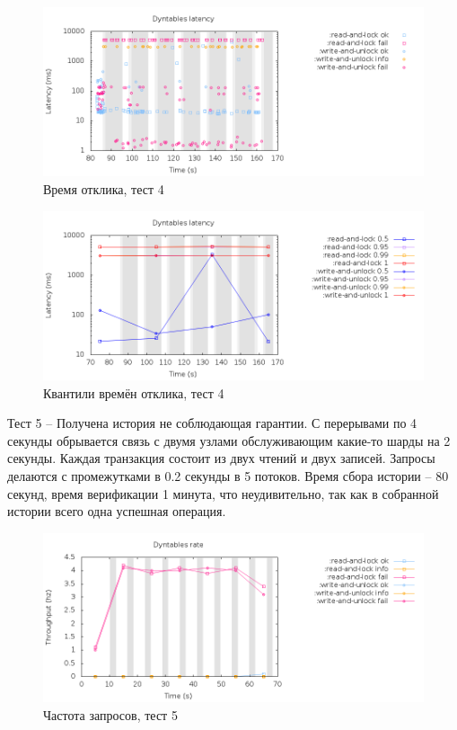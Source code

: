 \documentclass[pdftex,ptm,14pt,a4paper]{extreport}
\theoremstyle{definition}
\begin{document}
\begin{figure}[h]
    \includegraphics[scale=0.6]{dyntables-4/latency-raw.png}
    \caption{Время отклика, тест 4}
\end{figure}

\begin{figure}[h]
    \includegraphics[scale=0.6]{dyntables-4/latency-quantiles.png}
    \caption{Квантили времён отклика, тест 4}
\end{figure}

Тест 5 -- Получена история не соблюдающая гарантии. С перерывами по 4 секунды
обрывается связь с двумя узлами обслуживающим какие-то шарды на 2 секунды. Каждая транзакция состоит
из двух чтений и двух записей. Запросы делаются с промежутками в 0.2 секунды в 5 потоков.
Время сбора истории -- 80 секунд, время верификации 1 минута, что неудивительно, так как в собранной
истории всего одна успешная операция.

\begin{figure}[h]
    \includegraphics[scale=0.6]{dyntables-5/rate.png}
    \caption{Частота запросов, тест 5}
\end{figure}
\end{document}

